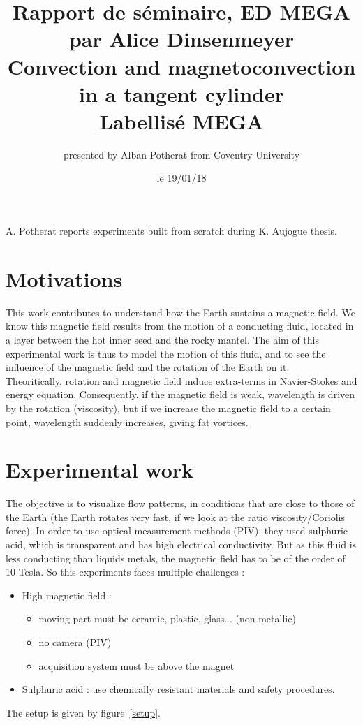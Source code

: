 \documentclass[12pt]{article}
\title{ {\fontsize{14pt}{14pt}\selectfont Rapport de séminaire, ED MEGA par Alice Dinsenmeyer} \\[1cm]
\fontsize{18pt}{18pt}\selectfont\textbf{ Convection and magnetoconvection in a tangent cylinder \\ Labellisé MEGA}} %
\author{
\large{presented by Alban Potherat from Coventry University}\\%
\vspace{-5mm}
}
\date{le 19/01/18}
\begin{document}
\maketitle
A. Potherat reports experiments built from scratch during K. Aujogue thesis. 

\section{Motivations}
 This work contributes to understand how the Earth sustains a magnetic field. We know this magnetic field results from the motion of a conducting fluid, located in a layer between the hot inner seed and the rocky mantel. The aim of this experimental work is thus to model the motion of this fluid, and to see the influence of the magnetic field and the rotation of the Earth on it. \\

Theoritically, rotation and magnetic field induce extra-terms in Navier-Stokes and energy equation. Consequently, if the magnetic field is weak, wavelength is driven by the rotation (viscosity), but if we increase the magnetic field to a certain point, wavelength suddenly increases, giving fat vortices.

\section{Experimental work}
The objective is to visualize flow patterns, in conditions that are close to those of the Earth (the Earth rotates very fast, if we look at the ratio viscosity/Coriolis force). In order to use optical measurement methods (PIV), they used sulphuric acid, which is transparent and has high electrical conductivity. But as this fluid is less conducting than liquids metals, the magnetic field has to be of the order of 10 Tesla. So this experiments faces multiple challenges : 
\begin{itemize}
        \item High magnetic field :
        \begin{itemize}
        		\item moving part must be ceramic, plastic, glass... (non-metallic)
        		\item no camera (PIV)
        		\item acquisition system must be above the magnet
	\end{itemize}
	\item Sulphuric acid : use chemically resistant materials and safety procedures.
\end{itemize}
The setup is given by figure~\ref{setup}.
\end{document}
